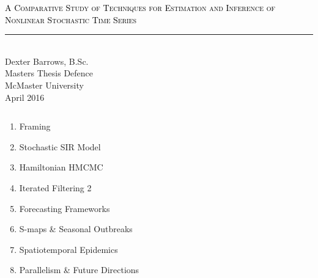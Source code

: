 \documentclass[12pt]{beamer}
\begin{document}
\begin{frame}

	\null
	\vfill
	\textcolor{black}{\textsc{\large A Comparative Study of Techniques for Estimation and Inference of Nonlinear Stochastic Time Series}} \\
	\vspace{1.5\baselineskip}
	\noindent\textcolor{black}{\rule{\textwidth}{0.4pt}} \\
	\vspace{2\baselineskip}
	Dexter Barrows, B.Sc. \\
	\vspace{1\baselineskip}
	Masters Thesis Defence \\
	McMaster University \\
	April 2016
	\vfill

\end{frame}


\begin{frame}

	\vspace{\baselineskip}
	\begin{columns}
		\begin{column}{0.8\textwidth}
			{\large
			\begin{enumerate}
				\item Framing
				\item Stochastic SIR Model
				\item Hamiltonian HMCMC
				\item Iterated Filtering 2
				\item Forecasting Frameworks
				\item S-maps \& Seasonal Outbreaks
				\item Spatiotemporal Epidemics
				\item Parallelism \& Future Directions
			\end{enumerate}
			}
		\end{column}
	\end{columns}

\end{frame}

\end{document}
